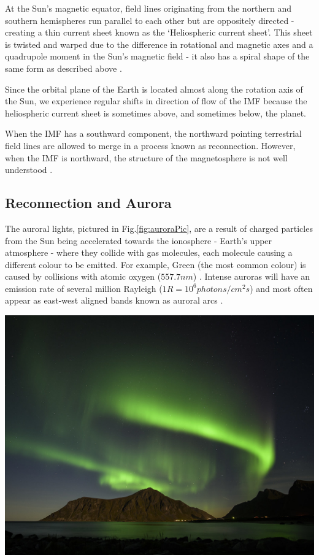 \documentclass[12pt]{article}
\newenvironment{Figure}
  {\par\medskip\noindent\minipage{\linewidth}}
  {\endminipage\par\medskip}
\begin{document}
At the Sun's magnetic equator, field lines originating from the northern and southern hemispheres run parallel to each other but are oppositely directed - creating a thin current sheet known as the `Heliospheric current sheet'. This sheet is twisted and warped due to the difference in rotational and magnetic axes and a quadrupole moment in the Sun's magnetic field - it also has a spiral shape of the same form as described above \cite{alfven_1942, ParkerSpiral}.

Since the orbital plane of the Earth is located almost along the rotation axis of the Sun, we experience regular shifts in direction of flow of the IMF because the heliospheric current sheet is sometimes above, and sometimes below, the planet. 

When the IMF has a southward component, the northward pointing terrestrial field lines are allowed to merge in a process known as reconnection. However, when the IMF is northward, the structure of the magnetosphere is not well understood \cite{Fear1506}.

\subsection{Reconnection and Aurora}
The auroral lights, pictured in Fig.\ref{fig:auroraPic}, are a result of charged particles from the Sun being accelerated towards the ionosphere - Earth's upper atmosphere - where they collide with gas molecules, each molecule causing a different colour to be emitted. 
For example, Green (the most common colour) is caused by collisions with atomic oxygen ($557.7 nm$) \cite{hollier, BSPP}. Intense auroras will have an emission rate of several million Rayleigh ($1R=10^6 photons/cm^2s$) and most often appear as east-west aligned bands known as auroral arcs \cite{BSPP}.

\begin{Figure}
    \begin{minipage}[c]{0.67\textwidth}
        \centering
        \includegraphics[width=0.8\linewidth]{nothernLights.jpg}
    \end{minipage}
    \begin{minipage}[c]{0.3\textwidth}
        \label{fig:auroraPic}
    \end{minipage}
\end{Figure}
\end{document}
